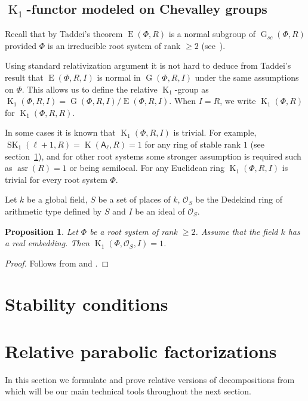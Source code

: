 \documentclass[12pt]{amsart}
\theoremstyle{plain} \declaretheorem[name=Theorem, Refname={Theorem,Theorems}]{thm} \Crefname{thm}{Theorem}{Theorems}
\numberwithin{equation}{section}
\newtheorem{prop}[lemma]{Proposition} \Crefname{prop}{Proposition}{Propositions}
\theoremstyle{definition} \newtheorem{dfn}[lemma]{Definition} \Crefname{dfn}{Definition}{Definitions}
\theoremstyle{remark} \newtheorem{rem}[lemma]{Remark} \Crefname{rem}{Remark}{Remarks}
\DeclareMathOperator{\K}{K}
\DeclareMathOperator{\SK}{SK}
\DeclareMathOperator{\G}{G}
\DeclareMathOperator{\E}{E}
\DeclareMathOperator{\asr}{asr}
\newcommand{\rA}{\mathsf{A}}
\begin{document}
\subsection{$\K_1$-functor modeled on Chevalley groups}
Recall that by Taddei's theorem $\E(\Phi, R)$ is a normal subgroup of $\G_{sc}(\Phi, R)$ provided $\Phi$ is an irreducible root system of rank $\geqslant 2$ (see~\cite{Ta}).

Using standard relativization argument it is not hard to deduce from Taddei's result that $\E(\Phi,R,I)$ is normal in $\G(\Phi,R,I)$ under the same assumptions on $\Phi$.
This allows us to define the relative $\K_1$-group as $\K_1(\Phi,R,I)=\G(\Phi,R,I)/\E(\Phi,R,I).$
When $I=R$, we write $\K_1(\Phi, R)$ for $\K_1(\Phi, R, R)$.

In some cases it is known that $\K_1(\Phi, R, I)$ is trivial.
For example, $\SK_1(\ell+1,R)=\K(\rA_\ell,R)=1$ for any ring of stable rank $1$ (see section~\ref{sec:stability-conditions}), 
and for other root systems some stronger assumption is required such as $\asr(R)=1$ or being semilocal. 
For any Euclidean ring $\K_1(\Phi, R, I)$ is trivial for every root system $\Phi$.

Let $k$ be a global field, $S$ be a set of places of $k$, 
$\mathcal{O}_S$ be the Dedekind ring of arithmetic type defined by $S$ and $I$ be an ideal of $\mathcal{O}_S$.
\begin{prop} \label{prop:K1triv}
Let $\Phi$ be a root system of rank $\geqslant2$. Assume that the field $k$ has a real embedding. Then $\K_1(\Phi,\mathcal{O}_S,I)=1$.
\end{prop}
\begin{proof} Follows from \cite[Theorem~3.6]{BassMilnorSerre} and \cite[Corollary~4.5]{Ma69}. \end{proof}

\section{Stability conditions}\label{sec:stability-conditions}


\section{Relative parabolic factorizations} \label{sec:factorizations}
In this section we formulate and prove relative versions of decompositions from~\cite{St78} which will be our main technical tools throughout the next section.
\end{document}
